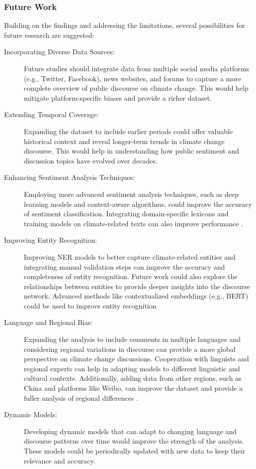 \subsubsection{Future Work}
Building on the findings and addressing the limitations, several possibilities for future research are suggested:
\begin{description}
    \item[Incorporating Diverse Data Sources:] Future studies should integrate data from multiple social media platforms (e.g., Twitter, Facebook), news websites, and forums to capture a more complete overview of public discourse on climate change. This would help mitigate platform-specific biases and provide a richer dataset.
    \item[Extending Temporal Coverage:] Expanding the dataset to include earlier periods could offer valuable historical context and reveal longer-term trends in climate change discourse. This would help in understanding how public sentiment and discussion topics have evolved over decades.
    \item[Enhancing Sentiment Analysis Techniques:] Employing more advanced sentiment analysis techniques, such as deep learning models and context-aware algorithms, could improve the accuracy of sentiment classification. Integrating domain-specific lexicons and training models on climate-related texts can also improve performance \cite{liu2012}.
    \item[Improving Entity Recognition:] Improving NER models to better capture climate-related entities and integrating manual validation steps can improve the accuracy and completeness of entity recognition. Future work could also explore the relationships between entities to provide deeper insights into the discourse network. Advanced methods like contextualized embeddings (e.g., BERT) could be used to improve entity recognition \cite{Devlin2019BERTPO}
    \item[Language and Regional Bias:] Expanding the analysis to include comments in multiple languages and considering regional variations in discourse can provide a more global perspective on climate change discussions. Cooperation with linguists and regional experts can help in adapting models to different linguistic and cultural contexts. Additionally, adding data from other regions, such as China and platforms like Weibo, can improve the dataset and provide a fuller analysis of regional differences \cite{8554131}.
    \item[Dynamic Models:] Developing dynamic models that can adapt to changing language and discourse patterns over time would improve the strength of the analysis. These models could be periodically updated with new data to keep their relevance and accuracy.

\end{description}
